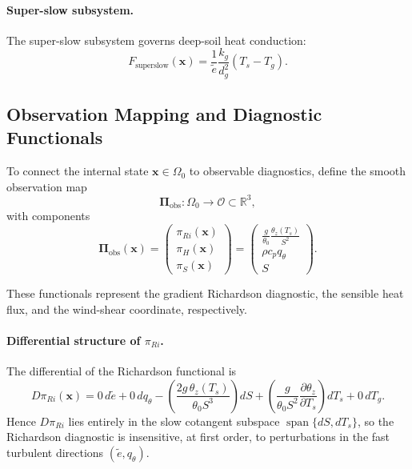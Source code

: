 \paragraph{Super-slow subsystem.}
The super-slow subsystem governs deep-soil heat conduction:
\begin{equation}
F_{\mathrm{superslow}}(\mathbf{x})
= \frac{1}{\tilde e}\frac{k_g}{d_g^2}(T_s - T_g).
\end{equation}

\subsection{Observation Mapping and Diagnostic Functionals}

To connect the internal state $\mathbf{x} \in \Omega_0$ to observable diagnostics, define the smooth observation map
\begin{equation}
\boldsymbol{\Pi}_{\mathrm{obs}} : \Omega_0 \to \mathcal O \subset \mathbb{R}^3,
\end{equation}
with components
\begin{equation}
\boldsymbol{\Pi}_{\mathrm{obs}}(\mathbf{x})
= \begin{pmatrix}
\pi_{Ri}(\mathbf{x}) \\
\pi_H(\mathbf{x}) \\
\pi_S(\mathbf{x})
\end{pmatrix}
= \begin{pmatrix}
\frac{g}{\theta_0}\frac{\theta_z(T_s)}{S^2} \\
\rho c_p q_\theta \\
S
\end{pmatrix}.
\end{equation}

These functionals represent the gradient Richardson diagnostic, the sensible heat flux, and the wind-shear coordinate, respectively.

\paragraph{Differential structure of $\pi_{Ri}$.}
The differential of the Richardson functional is
\begin{equation}
D\pi_{Ri}(\mathbf{x})
= 0\,d\tilde e
+ 0\,dq_\theta
- \left(\frac{2g\,\theta_z(T_s)}{\theta_0 S^3}\right)dS
+ \left(\frac{g}{\theta_0 S^2}\frac{\partial \theta_z}{\partial T_s}\right)dT_s
+ 0\,dT_g.
\end{equation}
Hence $D\pi_{Ri}$ lies entirely in the slow cotangent subspace $\operatorname{span}\{dS,dT_s\}$, so the Richardson diagnostic is insensitive, at first order, to perturbations in the fast turbulent directions $(\tilde e,q_\theta)$.

